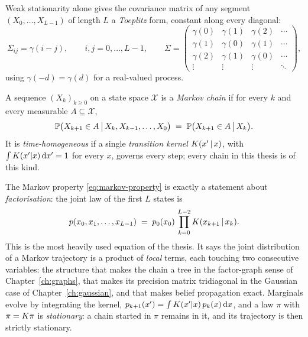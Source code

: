 Weak stationarity alone gives the covariance matrix of any segment
$(X_0,\ldots,X_{L-1})$ of length $L$ a \emph{Toeplitz} form, constant along
every diagonal:
\begin{equation}
  \Sigma_{ij} = \gamma(i-j), \qquad i,j = 0,\ldots,L-1,
  \qquad
  \Sigma =
  \begin{pmatrix}
    \gamma(0) & \gamma(1) & \gamma(2) & \cdots \\
    \gamma(1) & \gamma(0) & \gamma(1) & \cdots \\
    \gamma(2) & \gamma(1) & \gamma(0) & \cdots \\
    \vdots    & \vdots    & \vdots    & \ddots
  \end{pmatrix},
  \label{eq:toeplitz}
\end{equation}
using $\gamma(-d) = \gamma(d)$ for a real-valued process.

\begin{definition}
A sequence $(X_k)_{k \geq 0}$ on a state space $\mathcal{X}$ is a \emph{Markov
chain} if for every $k$ and every measurable $A \subseteq \mathcal{X}$,
\begin{equation}
  \mathbb{P}\big(X_{k+1} \in A \,\big|\, X_k, X_{k-1}, \dots, X_0\big)
  \;=\; \mathbb{P}\big(X_{k+1} \in A \,\big|\, X_k\big) .
  \label{eq:markov-property}
\end{equation}
It is \emph{time-homogeneous} if a single \emph{transition kernel}
$K(x' \,|\, x)$, with $\int K(x'|x)\,\mathrm{d} x' = 1$ for every $x$,
governs every step; every chain in this thesis is of this kind.
\end{definition}

The Markov property \eqref{eq:markov-property} is exactly a statement about
\emph{factorisation}: the joint law of the first $L$ states is
\begin{equation}
  p(x_0, x_1, \dots, x_{L-1})
  \;=\; p_0(x_0)\, \prod_{k=0}^{L-2} K(x_{k+1} \,|\, x_k) .
  \label{eq:chain-factorisation}
\end{equation}
This is the most heavily used equation of the thesis. It says the joint
distribution of a Markov trajectory is a product of \emph{local} terms, each
touching two consecutive variables: the structure that makes the chain a tree
in the factor-graph sense of Chapter~\ref{ch:graphs}, that makes its precision
matrix tridiagonal in the Gaussian case of Chapter~\ref{ch:gaussian}, and that
makes belief propagation exact. Marginals evolve by integrating the kernel,
$p_{k+1}(x') = \int K(x'|x)\, p_k(x)\,\mathrm{d} x$, and a law $\pi$ with
$\pi = K \pi$ is \emph{stationary}: a chain started in $\pi$ remains in
it, and its trajectory is then strictly stationary.

